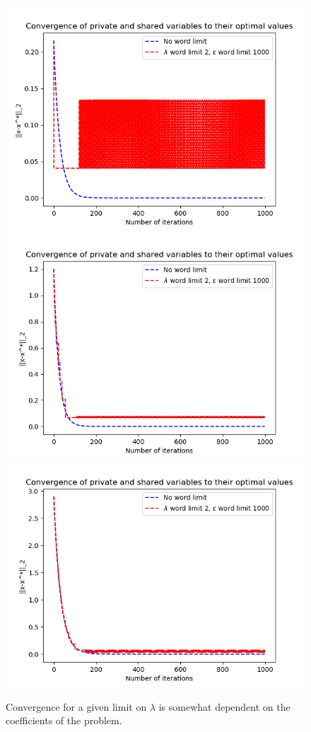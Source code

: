 \documentclass[12pt]{article}
\begin{document}
\begin{figure}[H]
	\centering
	\includegraphics[scale=0.5]{Problem4-Convergence5.png}
	\includegraphics[scale=0.5]{Problem4-Convergence6.png}
	\includegraphics[scale=0.5]{Problem4-Convergence7.png}
	\caption{Convergence for a given limit on $\lambda$ is somewhat dependent on the coefficients of the problem.}
\end{figure}
\end{document}
